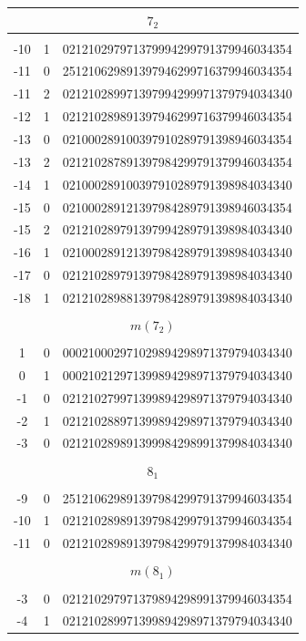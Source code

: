 \documentclass{article}
\begin{document}
\begin{supertabular}[h]{c c r}
\hline
{}                            \\
\hline\\[-3pt]
-10   & 1  & 021210297971379994299791379946034354  \\
-11   & 0  & 251210629891397946299716379946034354  \\
-11   & 2  & 021210289971397994299971379794034340  \\
-12   & 1  & 021210289891397946299716379946034354  \\
-13   & 0  & 021000289100397910289791398946034354  \\
-13   & 2  & 021210287891397984299791379946034354  \\
-14   & 1  & 021000289100397910289791398984034340  \\
-15   & 0  & 021000289121397984289791398946034354  \\
-15   & 2  & 021210289791397994289791398984034340  \\
-16   & 1  & 021000289121397984289791398984034340  \\
-17   & 0  & 021210289791397984289791398984034340  \\
-18   & 1  & 021210289881397984289791398984034340  \\
\\[-5pt]

\hline
{}                         \\
\hline\\[-3pt]
1     & 0  & 000210002971029894298971379794034340  \\
0     & 1  & 000210212971399894298971379794034340  \\
-1    & 0  & 021210279971399894298971379794034340  \\
-2    & 1  & 021210288971399894298971379794034340  \\
-3    & 0  & 021210289891399984298991379984034340  \\
\\[-5pt]

\hline
{}                            \\
\hline\\[-3pt]
-9    & 0  & 251210629891397984299791379946034354  \\
-10   & 1  & 021210289891397984299791379946034354  \\
-11   & 0  & 021210289891397984299791379984034340  \\
\\[-5pt]

\hline
{}                         \\
\hline\\[-3pt]
-3    & 0  & 021210297971379894298991379946034354  \\
-4    & 1  & 021210289971399894298971379794034340  \\
\end{supertabular}
\normalsize
\end{document}
